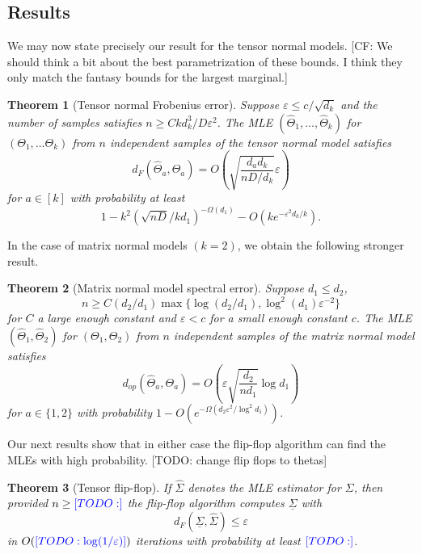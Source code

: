 \documentclass{article}
\newtheorem{theorem}{Theorem}
\newcommand\eps{\varepsilon}
\newcommand{\CF}[1]{{\color{purple}[CF: #1]}}
\newcommand{\TODO}[1]{{\color{blue}[TODO: #1]}}
\begin{document}



\subsection{Results}




We may now state precisely our result for the tensor normal models. \CF{We should think a bit about the best parametrization of these bounds. I think they only match the fantasy bounds for the largest marginal.}
\begin{theorem}[Tensor normal Frobenius error]\label{thm:tensor-frobenius} Suppose $\eps \leq c/\sqrt{d_k}$ and the number of samples satisfies $n \geq C k d_k^3/D\eps^2$. The MLE $(\widehat{\Theta}_1, \dots, \widehat{\Theta}_k) $ for $(\Theta_1, \dots \Theta_k)$ from $n$ independent samples of the tensor normal model satisfies
$$ d_{F}(\widehat{\Theta}_a, \Theta_a) = O\left( \sqrt{\frac{d_a d_k} {n D/d_k}}\eps\right) $$
for $a \in [k]$ with probability at least 
$$1 - k^2 \left(\sqrt{nD} / kd_1 \right)^{ - \Omega(d_1)} - O(k e^{ - \eps^2 d_k / k}).$$
\end{theorem}
 In the case of matrix normal models $(k=2)$, we obtain the following stronger result.

\begin{theorem}[Matrix normal model spectral error]\label{thm:matrix-normal} Suppose $d_1 \leq d_2$,
$$n \geq C (d_2/d_1) \max\{\log (d_2/d_1),  \log^2(d_1) \eps^{-2}\}$$ for $C$ a large enough constant and $\eps < c$ for a small enough constant $c$. The MLE $(\widehat{\Theta}_1,\widehat{\Theta}_2) $ for $(\Theta_1, \Theta_2)$ from $n$ independent samples of the matrix normal model satisfies
$$ d_{op}(\widehat{\Theta}_a, \Theta_a) = O\left(\eps \sqrt{\frac{d_2}{n d_1}} \log d_1\right) $$
for $a \in \{1,2\}$ with probability $1 - O(e^{ - \Omega( d_2 \eps^2/\log^2 d_1)})$.
\end{theorem}

Our next results show that in either case the flip-flop algorithm can find the MLEs with high probability. \TODO{change flip flops to thetas}

\begin{theorem}[Tensor flip-flop]\label{thm:tensor-flipflop} If $\hat{\Sigma}$ denotes the MLE estimator for $\Sigma$, then provided $n \geq \TODO{}$ the flip-flop algorithm computes $\underline{\Sigma}$ with
$$ d_F(\underline{\Sigma}, \hat{\Sigma}) \leq \eps $$
in $O(\TODO{\log(1/\eps)})$ iterations with probability at least $\TODO{}$.
\end{theorem}
\end{document}
